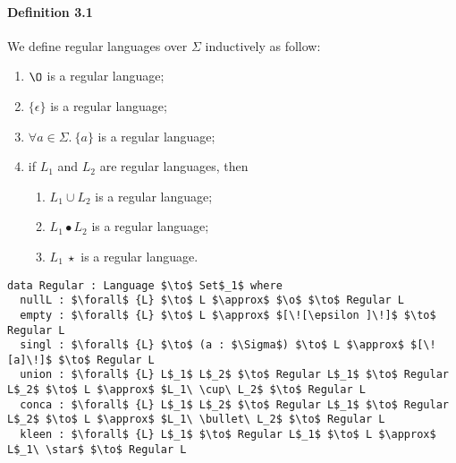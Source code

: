 \paragraph{Definition 3.1} We define regular languages over
\(\Sigma\) inductively as follow:
\begin{enumerate}[nolistsep]
  \item \(\O\) is a regular language;
  \item \(\{\epsilon\}\) is a regular language;
  \item \(\forall a\in\Sigma.\ \{a\}\) is a regular language;
  \item if \(L_1\) and \(L_2\) are regular languages, then
    \begin{enumerate}[nolistsep]
      \item \(L_1\cup L_2\) is a regular language;
      \item \(L_1\bullet L_2\) is a regular language;
      \item \(L_1\ \star\) is a regular language.
    \end{enumerate}
\end{enumerate}
\vspace{0.7pc}
\begin{lstlisting}[caption=Regular languages,mathescape=true]
data Regular : Language $\to$ Set$_1$ where
  nullL : $\forall$ {L} $\to$ L $\approx$ $\o$ $\to$ Regular L
  empty : $\forall$ {L} $\to$ L $\approx$ $[\![\epsilon ]\!]$ $\to$ Regular L
  singl : $\forall$ {L} $\to$ (a : $\Sigma$) $\to$ L $\approx$ $[\![a]\!]$ $\to$ Regular L
  union : $\forall$ {L} L$_1$ L$_2$ $\to$ Regular L$_1$ $\to$ Regular L$_2$ $\to$ L $\approx$ $L_1\ \cup\ L_2$ $\to$ Regular L
  conca : $\forall$ {L} L$_1$ L$_2$ $\to$ Regular L$_1$ $\to$ Regular L$_2$ $\to$ L $\approx$ $L_1\ \bullet\ L_2$ $\to$ Regular L
  kleen : $\forall$ {L} L$_1$ $\to$ Regular L$_1$ $\to$ L $\approx$ L$_1\ \star$ $\to$ Regular L
\end{lstlisting}

